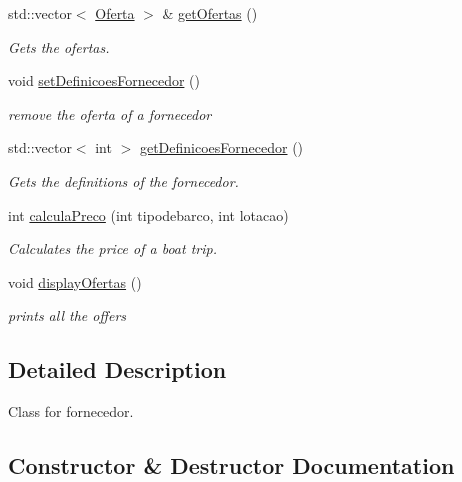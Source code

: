 \begin{DoxyCompactItemize}
std\+::vector$<$ \hyperlink{classOferta}{Oferta} $>$ \& \hyperlink{classFornecedor_a7ef7f5f79e2c61aaca5d60c06b2a0051}{get\+Ofertas} ()
\begin{DoxyCompactList}\small\item\em Gets the ofertas. \end{DoxyCompactList}\item 
void \hyperlink{classFornecedor_a0a0945cbd2fd120d9eab5d5aec441b72}{set\+Definicoes\+Fornecedor} ()
\begin{DoxyCompactList}\small\item\em remove the oferta of a fornecedor \end{DoxyCompactList}\item 
std\+::vector$<$ int $>$ \hyperlink{classFornecedor_a94de4f30aa8328ce58dc1a8ec18e24c2}{get\+Definicoes\+Fornecedor} ()
\begin{DoxyCompactList}\small\item\em Gets the definitions of the fornecedor. \end{DoxyCompactList}\item 
int \hyperlink{classFornecedor_a53594b9690eb9ed098b5c9baa3d46c31}{calcula\+Preco} (int tipodebarco, int lotacao)
\begin{DoxyCompactList}\small\item\em Calculates the price of a boat trip. \end{DoxyCompactList}\item 
\mbox{\label{classFornecedor_a858875f921d2eebb652c4b7628f95c71}} 
void \hyperlink{classFornecedor_a858875f921d2eebb652c4b7628f95c71}{display\+Ofertas} ()
\begin{DoxyCompactList}\small\item\em prints all the offers \end{DoxyCompactList}\end{DoxyCompactItemize}


\subsection{Detailed Description}
Class for fornecedor. 

\subsection{Constructor \& Destructor Documentation}
\mbox{\label{classFornecedor_a0cbc4556289cc946756039ab0da52756}} 
